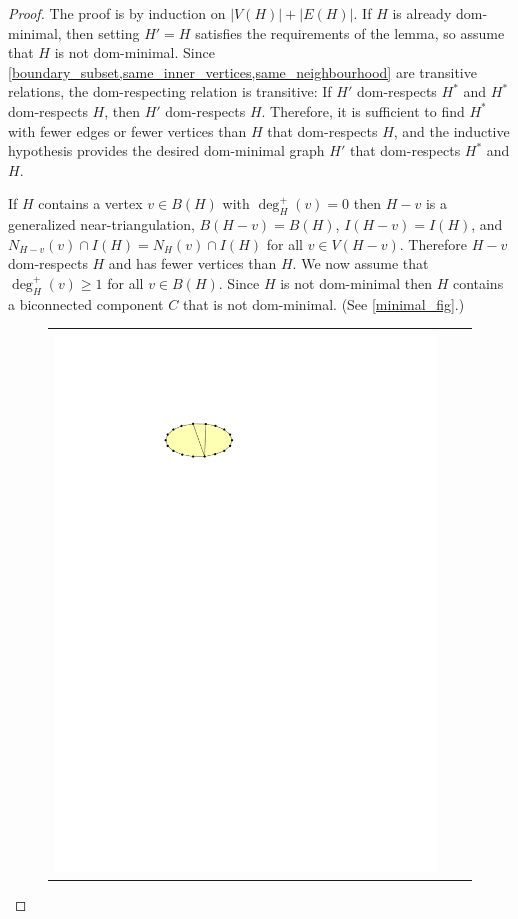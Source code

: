 \documentclass[12pt]{article}
\theoremstyle{definition}
\begin{document}
\begin{proof}
  The proof is by induction on $|V(H)|+|E(H)|$.  If $H$ is already dom-minimal, then setting $H'=H$ satisfies the requirements of the lemma, so assume that $H$ is not dom-minimal.  Since \cref{boundary_subset,same_inner_vertices,same_neighbourhood} are transitive relations, the dom-respecting relation is transitive: If $H'$ dom-respects $H^*$ and $H^*$ dom-respects $H$, then $H'$ dom-respects $H$.  Therefore, it is sufficient to find $H^*$ with fewer edges or fewer vertices than $H$ that dom-respects $H$, and the inductive hypothesis provides the desired dom-minimal graph $H'$ that dom-respects $H^*$ and $H$.

  If $H$ contains a vertex $v\in B(H)$ with $\deg^+_H(v)=0$ then $H-v$ is a generalized near-triangulation, $B(H-v)=B(H)$, $I(H-v)=I(H)$, and $N_{H-v}(v)\cap I(H)=N_{H}(v)\cap I(H)$ for all $v\in V(H-v)$. Therefore $H-v$ dom-respects $H$ and has fewer vertices than $H$.  We now assume that $\deg^+_H(v)\ge 1$ for all $v\in B(H)$.  Since $H$ is not dom-minimal then $H$ contains a biconnected component $C$ that is not dom-minimal. (See \cref{minimal_fig}.)
  \begin{figure}
    \centering
    \begin{tabular}{ccc}
      \includegraphics[page=1]{figs/minimal} &

\end{tabular}
\end{figure}
\end{proof}
\end{document}
